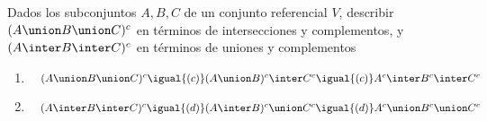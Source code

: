 \begin{enunciado}{\ejercicio}
        Dados los subconjuntos $A,B,C$ de un conjunto referencial $V$, describir $(A \union B \union C)^c$ en términos
        de intersecciones y complementos, y $(A \inter B \inter C)^c$ en términos de uniones y complementos
\end{enunciado}

\begin{enumerate}[label=\roman*)]
	\item $\quad (A \union B \union C)^c \igual{(c)} (A \union B)^c \inter C^c \igual{(c)} A^c \inter B^c \inter C^c$\Tilde
	\item $\quad (A \inter B \inter C)^c \igual{(d)} (A \inter B)^c \union C^c \igual{(d)} A^c \union B^c \union C^c$\Tilde
\end{enumerate}

